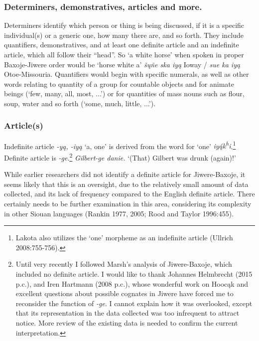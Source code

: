 \documentclass[output=paper]{LSP/langsci}
\begin{document}
\subsubsection{Determiners, demonstratives, articles and more.}  Determiners identify which person or thing is being discussed, if it is a specific individual(s) or a generic one, how many there are, and so forth.  They include quantifiers, demonstratives, and at least one definite article and an indefinite article, which all follow their ``head''.  So `a white horse' when spoken in proper Baxoje-Jiwere order would be `horse white a' \textit{\v{s}\k{u}\~ne ska iy\k{a}} Ioway / \textit{sue ka iy\k{a}} Otoe-Missouria.  Quantifiers would begin with specific numerals, as well as other words relating to quantity of a group for countable objects and for animate beings (`few, many, all, most, ...') or for quantities of mass nouns such as flour, soup, water and so forth (`some, much, little, ...').   

\subsubsection{Article(s)}  

Indefinite article \textit{-y\k{a}, -iy\k{a}} `a, one' is derived from the word for `one' \textit{iy\k{\'a}k\textsuperscript{h}i}.\footnote{Lakota also utilizes the `one' morpheme as an indefinite article (Ullrich 2008:755-756).} Definite article is \textit{-ge}.\footnote{Until very recently I followed Marsh's analysis of Jiwere-Baxoje, which included no definite article. I would like to thank Johannes Helmbrecht (2015 p.c.), and Iren Hartmann (2008 p.c.), whose wonderful work on Hooc\k{a}k and excellent questions about possible cognates in Jiwere have forced me to reconsider the function of \textit{-ge}. I cannot explain how it was overlooked, except that its representation in the data collected was too infrequent to attract notice. More review of the existing data is needed to confirm the current interpretation.}   \textit{Gilbert-ge danie.}  `(That) Gilbert was drunk (again)!'

While earlier researchers did not identify a definite article for Jiwere-Baxoje, it seems likely that this is an oversight, due to the relatively small amount of data collected, and its lack of frequency compared to the English definite article. There certainly needs to be further examination in this area, considering its complexity in other Siouan languages (Rankin 1977, 2005; Rood and Taylor 1996:455).  
\end{document}
